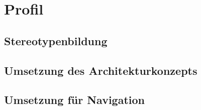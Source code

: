 \section{Profil}
\subsection{Stereotypenbildung}
\subsection{Umsetzung des Architekturkonzepts}
\subsection{Umsetzung für Navigation}